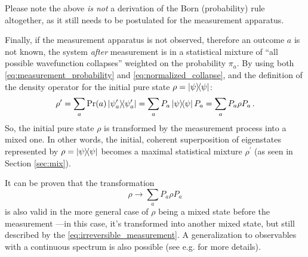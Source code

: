 Please note the above \emph{is not} a derivation of the Born (probability) rule altogether,
as it still needs to be postulated for the measurement apparatus.

Finally, if the measurement apparatus is not observed,
therefore an outcome $a$ is not known,
the system \emph{after} measurement is in a statistical mixture
of ``all possible wavefunction collapses'' weighted on the probability $\pi_{a}$.
By using both \eqref{eq:measurement_probability} and \eqref{eq:normalized_collapse},
and the definition of the density operator for the initial pure state
$\rho = \ketbra{\psi}$:
\[
  \rho^{\prime} = \sum_a \Pr(a) \ketbra{\psi^{\prime}_a} = \sum_a P_a \ketbra{\psi} P_a
    = \sum_a P_a \rho P_a \,\text{.}
\]
So, the initial pure state $\rho$ is transformed by the measurement process into a mixed one.
In other words, the initial, coherent superposition of eigenstates represented by $\rho = \ketbra{\psi}$
becomes a maximal statistical mixture $\rho^{\prime}$
(as seen in Section \ref{sec:mix}).

It can be proven that the transformation
\begin{equation}\label{eq:irreversible_measurement}
  \rho \rightarrow \sum_a P_a \rho P_a
\end{equation}
is also valid in the more general case of $\rho$ being a mixed state before the measurement
---in this case, it's transformed into another mixed state,
but still described by the \eqref{eq:irreversible_measurement}.
A generalization to observables with a continuous spectrum is also possible
(see e.g. \cite[Section 3.1.1]{PreskillNotes} for more details).
